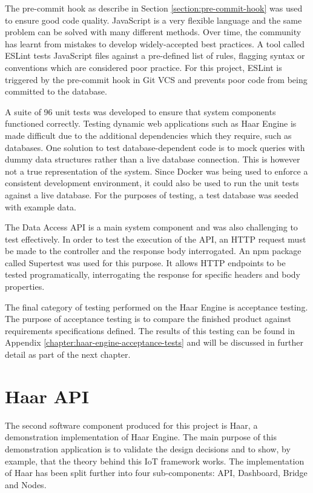       The pre-commit hook as describe in Section \ref{section:pre-commit-hook} was used to ensure good code quality. JavaScript is a very flexible language and the same problem can be solved with many different methods. Over time, the community has learnt from mistakes to develop widely-accepted best practices. A tool called ESLint tests JavaScript files against a pre-defined list of rules, flagging syntax or conventions which are considered poor practice. For this project, ESLint is triggered by the pre-commit hook in Git VCS and prevents poor code from being committed to the database.

      A suite of 96 unit tests was developed to ensure that system components functioned correctly. Testing dynamic web applications such as Haar Engine is made difficult due to the additional dependencies which they require, such as databases. One solution to test database-dependent code is to mock queries with dummy data structures rather than a live database connection. This is however not a true representation of the system. Since Docker was being used to enforce a consistent development environment, it could also be used to run the unit tests against a live database. For the purposes of testing, a test database was seeded with example data.

      The Data Access API is a main system component and was also challenging to test effectively. In order to test the execution of the API, an HTTP request must be made to the controller and the response body interrogated. An npm package called Supertest was used for this purpose. It allows HTTP endpoints to be tested programatically, interrogating the response for specific headers and body properties.

      The final category of testing performed on the Haar Engine is acceptance testing. The purpose of acceptance testing is to compare the finished product against requirements specifications defined. The results of this testing can be found in Appendix \ref{chapter:haar-engine-acceptance-tests} and will be discussed in further detail as part of the next chapter.

  \section{Haar API}
    The second software component produced for this project is Haar, a demonstration implementation of Haar Engine. The main purpose of this demonstration application is to validate the design decisions and to show, by example, that the theory behind this IoT framework works. The implementation of Haar has been split further into four sub-components: API, Dashboard, Bridge and Nodes.


